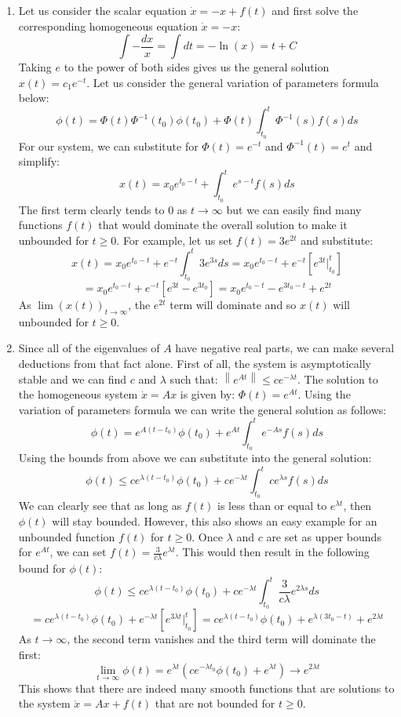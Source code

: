 \documentclass[12pt,letterpaper,reqno]{amsart}
\begin{document}
\begin{enumerate}
\begin{enumerate}
    \item Let us consider the scalar equation $\dot{x} = -x + f(t)$ and first solve the corresponding homogeneous equation $\dot{x} = -x$:
    $$\int -\frac{dx}{x} = \int dt = -\ln(x) = t + C$$
    Taking $e$ to the power of both sides gives us the general solution $x(t) = c_1e^{-t}$. Let us consider the general variation of parameters formula below:
    $$\phi(t) = \Phi(t)\Phi^{-1}(t_0)\phi(t_0) + \Phi(t)\int_{t_0}^t \Phi^{-1}(s)f(s)ds$$
    For our system, we can substitute for $\Phi(t) = e^{-t}$ and $\Phi^{-1}(t) = e^t$ and simplify:
    $$x(t) = x_0e^{t_0 - t} + \int_{t_0}^t e^{s-t}f(s)ds$$
    The first term clearly tends to 0 as $t \rightarrow \infty$ but we can easily find many functions $f(t)$ that would dominate the overall solution to make it unbounded for $t \geq 0$. For example, let us set $f(t) = 3e^{2t}$ and substitute:
    $$x(t) = x_0e^{t_0 - t} + e^{-t}\int_{t_0}^t 3e^{3s}ds = x_0e^{t_0 - t} + e^{-t}\left[e^{3t} \Big|_{t_0}^t\right]$$
    $$ = x_0e^{t_0 - t} + e^{-t}\left[ e^{3t} - e^{3t_0} \right]  = x_0e^{t_0 - t} - e^{3t_0 - t} + e^{2t}$$
    As $\lim(x(t))_{t\rightarrow\infty}$, the $e^{2t}$ term will dominate and so $x(t)$ will unbounded for $t \geq 0$.
    \newline
    
    \item Since all of the eigenvalues of $A$ have negative real parts, we can make several deductions from that fact alone. First of all, the system is asymptotically stable and we can find $c$ and $\lambda$ such that: $\left\| e ^ { A t } \right\| \leq c e ^ { - \lambda t }$. The solution to the homogeneous system $\dot{x} = Ax$ is given by: $\Phi(t) = e^{At}$. Using the variation of parameters formula we can write the general solution as follows:
    $$\phi(t) = e^{A(t-t_0)}\phi(t_0) + e^{At}\int_{t_0}^t e^{-As}f(s)ds$$
    Using the bounds from above we can substitute into the general solution:
    $$\phi(t) \leq c e^{\lambda(t-t_0)}\phi(t_0) + ce^{-\lambda t}\int_{t_0}^t ce^{\lambda s}f(s)ds$$
    We can clearly see that as long as $f(t)$ is less than or equal to $e^{\lambda t}$, then $\phi(t)$ will stay bounded. However, this also shows an easy example for an unbounded function $f(t)$ for $t \geq 0$. Once $\lambda$ and $c$ are set as upper bounds for $e^{At}$, we can set $f(t) = \frac{3}{c\lambda} e^{\lambda t}$. This would then result in the following bound for $\phi(t)$:
    $$\phi(t) \leq c e^{\lambda(t-t_0)}\phi(t_0) + ce^{-\lambda t}\int_{t_0}^t \frac{3}{c\lambda} e^{2\lambda s}ds$$
    $$= c e^{\lambda(t-t_0)}\phi(t_0) + e^{-\lambda t}\left[e^{3 \lambda t} \Big|_{t_0}^t\right] = c e^{\lambda(t-t_0)}\phi(t_0) + e^{\lambda(3 t_0 - t)} + e^{2 \lambda t}$$
    As $t \rightarrow \infty$, the second term vanishes and the third term will dominate the first:
    $$\lim_{t \rightarrow \infty} \phi(t) = e^{\lambda t}(c e^{-\lambda t_0}\phi(t_0) + e^{\lambda t}) \rightarrow e^{2 \lambda t}$$
    This shows that there are indeed many smooth functions that are solutions to the system $\dot{x} = Ax + f(t)$ that are not bounded for $t \geq 0$.
    \newline
    

\end{enumerate}
\end{enumerate}
\end{document}
